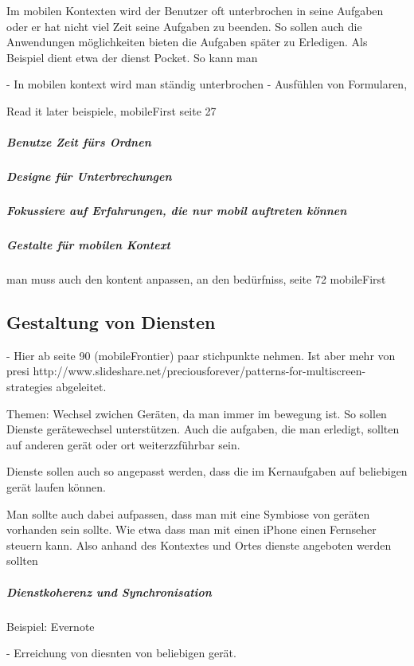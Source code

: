 Im mobilen Kontexten wird der Benutzer oft unterbrochen in seine Aufgaben oder er hat nicht viel Zeit seine Aufgaben zu beenden. So sollen auch die Anwendungen möglichkeiten bieten die Aufgaben später zu Erledigen. Als Beispiel dient etwa der dienst Pocket. So kann man 

- In mobilen kontext wird man ständig unterbrochen
- Ausfühlen von Formularen, 

Read it later beispiele, mobileFirst seite 27

\subparagraph{Benutze Zeit fürs Ordnen}
\label{subp:benutze_zeit_als_ordnungsprinzip}


\subparagraph{Designe für Unterbrechungen} %
\label{subp:designe_f_r_unterbrechungen}


\subparagraph{Fokussiere auf Erfahrungen, die nur mobil auftreten können} %
\label{subp:fokussiere_auf_erfahrungen_die_nur_mobil_auftreten_k_nnen}

\subparagraph{Gestalte für mobilen Kontext}
\label{subp:gestalte_f_r_mobilen_kontext}



man muss auch den kontent anpassen, an den bedürfniss, seite 72 mobileFirst


\subsection{Gestaltung von Diensten}
\label{sub:gestaltung_von_diensten}

- Hier ab seite 90 (mobileFrontier) paar stichpunkte nehmen. Ist aber mehr von presi http://www.slideshare.net/preciousforever/patterns-for-multiscreen-strategies abgeleitet. 

Themen: Wechsel zwichen Geräten, da man immer im bewegung ist. So sollen Dienste gerätewechsel unterstützen. Auch die aufgaben, die man erledigt, sollten auf anderen gerät oder ort weiterzzführbar sein.

Dienste sollen auch so angepasst werden, dass die im Kernaufgaben auf beliebigen gerät laufen können.

Man sollte auch dabei aufpassen, dass man mit eine Symbiose von geräten vorhanden sein sollte. Wie etwa dass man mit einen iPhone einen Fernseher steuern kann. Also anhand des Kontextes und Ortes dienste angeboten werden sollten

\subparagraph{Dienstkoherenz und Synchronisation}
\label{subp:diensmobilit_t}

Beispiel: Evernote

- Erreichung von diesnten von beliebigen gerät.


